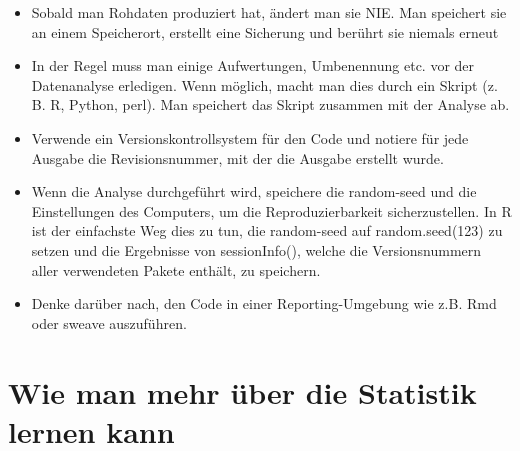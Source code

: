\documentclass[a4paper,twoside]{tufte-book}\usepackage[]{graphicx}\usepackage[]{color}
\begin{document}
\begin{itemize}

\item{Sobald man Rohdaten produziert hat, ändert man sie NIE. Man speichert sie an einem Speicherort, erstellt eine Sicherung und berührt sie niemals erneut}

\item{In der Regel muss man einige Aufwertungen, Umbenennung etc. vor der Datenanalyse erledigen. Wenn möglich, macht man dies durch ein Skript (z. B. R, Python, perl). Man speichert das Skript zusammen mit der Analyse ab.}

\item{Verwende ein Versionskontrollsystem für den Code und notiere für jede Ausgabe die Revisionsnummer, mit der die Ausgabe erstellt wurde.}

\item{Wenn die Analyse durchgeführt wird, speichere die random-seed und die Einstellungen des Computers, um die Reproduzierbarkeit sicherzustellen. In R ist der einfachste Weg dies zu tun, die random-seed auf random.seed(123) zu setzen und die Ergebnisse von sessionInfo(), welche die Versionsnummern aller verwendeten Pakete enthält, zu speichern.}

\item{Denke darüber nach, den Code in einer Reporting-Umgebung wie z.B. Rmd oder sweave auszuführen.}



\end{itemize}

\section{Wie man mehr über die Statistik lernen kann}\label{sec: further readings}
\end{document}
